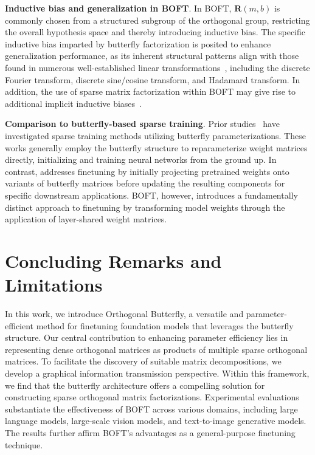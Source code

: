 \textbf{Inductive bias and generalization in BOFT}. In BOFT, $\bm{R}(m,b)$ is commonly chosen from a structured subgroup of the orthogonal group, restricting the overall hypothesis space and thereby introducing inductive bias. The specific inductive bias imparted by butterfly factorization is posited to enhance generalization performance, as its inherent structural patterns align with those found in numerous well-established linear transformations~\cite{dao2019kaleidoscope}, including the discrete Fourier transform, discrete sine/cosine transform, and Hadamard transform. In addition, the use of sparse matrix factorization within BOFT may give rise to additional implicit inductive biases~\cite{gunasekar2017implicit,li2018algorithmic,liu2019neural}.

\textbf{Comparison to butterfly-based sparse training}. Prior studies~\cite{dao2019learning,dao2019kaleidoscope,chen2022pixelated,dao2022monarch} have investigated sparse training methods utilizing butterfly parameterizations. These works generally employ the butterfly structure to reparameterize weight matrices directly, initializing and training neural networks from the ground up. In contrast, \cite{dao2022monarch} addresses finetuning by initially projecting pretrained weights onto variants of butterfly matrices before updating the resulting components for specific downstream applications. BOFT, however, introduces a fundamentally distinct approach to finetuning by transforming model weights through the application of layer-shared weight matrices.



\section{Concluding Remarks and Limitations}

In this work, we introduce Orthogonal Butterfly, a versatile and parameter-efficient method for finetuning foundation models that leverages the butterfly structure. Our central contribution to enhancing parameter efficiency lies in representing dense orthogonal matrices as products of multiple sparse orthogonal matrices. To facilitate the discovery of suitable matrix decompositions, we develop a graphical information transmission perspective. Within this framework, we find that the butterfly architecture offers a compelling solution for constructing sparse orthogonal matrix factorizations. Experimental evaluations substantiate the effectiveness of BOFT across various domains, including large language models, large-scale vision models, and text-to-image generative models. The results further affirm BOFT's advantages as a general-purpose finetuning technique.


